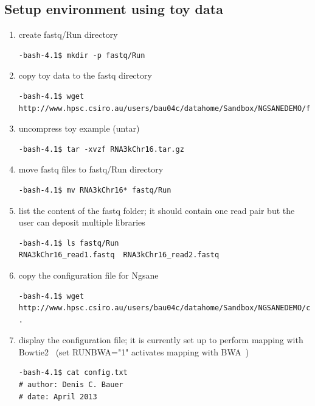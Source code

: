 \documentclass{article}
\newcommand{\prog}{{\sc Ngsane}}
\begin{document}
\subsection{Setup environment using toy data}
\begin{enumerate}
\item  create fastq/Run directory
\begin{small}\begin{verbatim}
-bash-4.1$ mkdir -p fastq/Run
\end{verbatim}\end{small}
\item  copy toy data to the fastq directory
\begin{small}\begin{verbatim}
-bash-4.1$ wget http://www.hpsc.csiro.au/users/bau04c/datahome/Sandbox/NGSANEDEMO/fastq/Run/RNA3kChr16.tar.gz
\end{verbatim}\end{small}
\item uncompress toy example (untar)
\begin{small}\begin{verbatim}
-bash-4.1$ tar -xvzf RNA3kChr16.tar.gz
\end{verbatim}\end{small}
\item move fastq files to fastq/Run directory 
\begin{small}\begin{verbatim}
-bash-4.1$ mv RNA3kChr16* fastq/Run
\end{verbatim}\end{small}
\item list the content of the fastq folder; it should contain one read pair but the user can deposit multiple libraries
\begin{small}\begin{verbatim}
-bash-4.1$ ls fastq/Run
RNA3kChr16_read1.fastq  RNA3kChr16_read2.fastq
\end{verbatim}\end{small}
\item copy the configuration file for \prog
\begin{small}\begin{verbatim}
-bash-4.1$ wget http://www.hpsc.csiro.au/users/bau04c/datahome/Sandbox/NGSANEDEMO/config.txt .
\end{verbatim}\end{small}
\item display the configuration file; it is currently  set up to perform mapping with Bowtie2~\citep{Langmead2012} (set RUNBWA="1" activates mapping with BWA~\citep{Li2009})
\begin{small}\begin{verbatim}
-bash-4.1$ cat config.txt
# author: Denis C. Bauer
# date: April 2013


\end{verbatim}
\end{small}
\end{enumerate}
\end{document}

